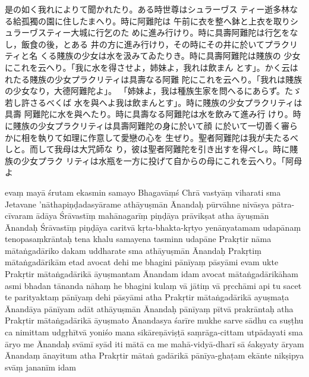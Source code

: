 \newpage

%
是の如く我れによりて聞かれたり。ある時世尊はシュラーヷス
ティー逝多林なる給孤獨の園に住したまへり。時に阿難陀は
午前に衣を整へ鉢と上衣を取りシュラーヷスティー大城に行乞のた
めに進み行けり。時に具壽阿難陀は行乞をなし，飯食の後，とある
井の方に進み行けり，その時にその井に於いてプラクリティと名
くる賤族の少女は水を汲みてゐたりき。時に具壽阿難陀は賤族の
少女にこれを云へり。「我に水を得させよ，姉妹よ，我れは飲まん
とす」。かく云はれたる賤族の少女プラクリティは具壽なる阿難
陀にこれを云へり。「我れは賤族の少女なり，大德阿難陀よ」。
「姉妹よ，我は種族生家を問へるにあらず。たゞ若し許さるべくば
水を與へよ我は飲まんとす」。時に賤族の少女プラクリティは具壽
阿難陀に水を與へたり。時に具壽なる阿難陀は水を飲みて進み行
けり。時に賤族の少女プラクリティは具壽阿難陀の身に於いて顔
に於いて一切善く審らかに相を執りて如理に作意して愛戀の心を
生ぜり。聖者阿難陀は我が夫たるべしと。而して我母は大咒師な
り，彼は聖者阿難陀を引き出すを得べし。時に賤族の少女プラク
リティは水瓶を一方に投げて自からの母にこれを云へり。「阿母よ

\newpage
{}
evaṃ mayā śrutam \da{} ekasmin samayo Bhagavāṃś Chrā\-%
vastyāṃ viharati sma Jetavane 'nāthapiṇḍadasyārame \da{}
athāyuṣmān Ānandaḥ pūrvāhne nivāsya pātra-cīvaram ādāya
Śrāvastīṃ mahānagarīṃ piṇḍāya prāvikṣat \da{} atha āyuṣmān
Ānandaḥ Śrāvastīṃ piṇḍāya caritvā kṛta-bhakta-kṛtyo
yenānyatamam udapānaṃ tenopasaṃkrāntaḥ \da{} tena khalu
samayena tasminn udapāne Prakṛtir nāma mātaṅgadāriko\-%
dakam uddharate sma \da{} athāyuṣmān Ānandaḥ Prakṛtiṃ
mātaṅgadārikām etad avocat \da{} dehi me bhagini pānīyaṃ
pāsyāmi \da{} evam ukte Prakṛtir mātaṅgadārikā āyuṣmantam
Ānandam idam avocat \da{} mātaṅgadārikāham asmi bhadan\-%
tānanda \da{} nāhaṃ he bhagini kulaṃ vā jātiṃ vā pṛcchāmi
api tu sacet te parityaktaṃ pānīyaṃ dehi pāsyāmi \da{} atha
Prakṛtir mātaṅgadārikā ayuṣmaṭa Ānandāya pānīyam adāt \da{}
athāyuṣmān Ānandaḥ pānīyaṃ pītvā prakrāntaḥ \da{} atha
Prakṛtir mātaṅgadārikā āyuṣmato Ānandasya śarīre mukhe
sarve sādhu ca suṣṭhu ca nimittam udgṛhītvā yoniśo mana\-%
sikāreṇāviṣṭā saṃrāga-cittam utpādayati sma \da{} āryo me
Ānandaḥ svāmī syād iti \da{} mātā ca me mahā-vidyā-dharī sā
śakṣyaty āryam Ānandaṃ ānayitum \da{} atha Prakṛtir mātaṅ\-%
gadārikā pānīya-ghaṭam ekānte nikṣipya svāṃ jananīm idam

